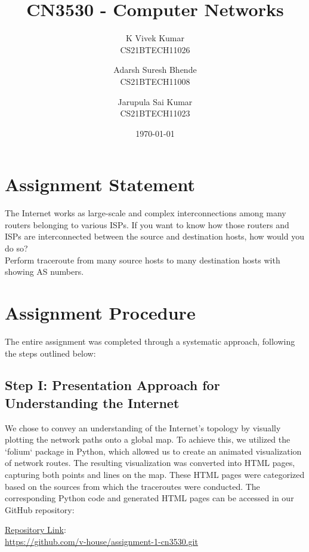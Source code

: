 \documentclass{article}
\title{CN3530 - Computer Networks}
\author{K Vivek Kumar \\ CS21BTECH11026 \and
        Adarsh Suresh Bhende \\ CS21BTECH11008 \and
        Jarupula Sai Kumar \\ CS21BTECH11023}
\date{\today}
\begin{document}
\maketitle


\section{Assignment Statement}
The Internet works as large-scale and complex interconnections among many routers belonging to various ISPs. If you want to know how those routers and ISPs are interconnected between the source and destination hosts, how would you do so?\\
Perform traceroute from many source hosts to many destination hosts with showing AS numbers.

\section{Assignment Procedure}

The entire assignment was completed through a systematic approach, following the steps outlined below:

\subsection{Step I: Presentation Approach for Understanding the Internet}

We chose to convey an understanding of the Internet's topology by visually plotting the network paths onto a global map. To achieve this, we utilized the `folium` package in Python, which allowed us to create an animated visualization of network routes. The resulting visualization was converted into HTML pages, capturing both points and lines on the map. These HTML pages were categorized based on the sources from which the traceroutes were conducted. The corresponding Python code and generated HTML pages can be accessed in our GitHub repository:

\href{https://github.com/v-house/assignment-1-cn3530.git}{Repository Link}: \\ \url{https://github.com/v-house/assignment-1-cn3530.git}
\end{document}

